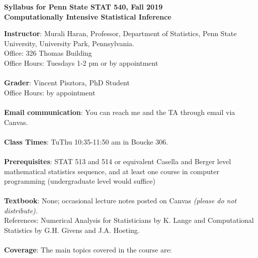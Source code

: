 \documentclass[10pt]{article}
\begin{document}
\pagestyle{empty}
\vspace{-0.5in}
\Large
\begin{center}
{\bf Syllabus for Penn State STAT 540, Fall 2019}\\
{\bf Computationally Intensive Statistical Inference}\\
\end{center}
\normalsize {\bf Instructor}: Murali Haran, Professor, Department of Statistics, Penn State University, University Park, Pennsylvania.\\ Office: 326 Thomas
Building \\ Office
Hours: Tuesdays 1-2 pm or by appointment\\\\ 
{\bf Grader}: Vincent Pisztora, PhD Student \\  
Office Hours: by appointment \\\\
{\bf Email communication}: You can reach me and the TA through email via Canvas.\\\\ %
{\bf Class Times}: TuThu 10:35-11:50 am in Boucke 306.\\\\
{\bf Prerequisites}: STAT 513 and 514 or equivalent Casella and Berger
level mathematical statistics sequence, and at least one course in computer
programming (undergraduate level would suffice)\\\\
{\bf Textbook}: None; occasional lecture notes posted on Canvas {\it (please do 
 not distribute).} \\References: Numerical Analysis for Statisticians by K. Lange and Computational Statistics by G.H. Givens and J.A. Hoeting. \\\\
{\bf Coverage}: The main topics covered in the course are:
\end{document}
